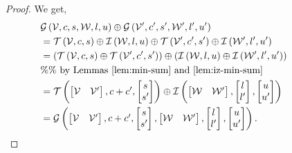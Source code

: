 \begin{proof}
  We get,
  \begin{align*}
& \mathcal{G}\left(\mathcal{V},c,s,\mathcal{W},l,u\right)\oplus \mathcal{G}\left(\mathcal{V}^\prime,c^\prime,s^\prime,\mathcal{W}^\prime,l^\prime,u^\prime\right)\\
& =
    \mathit{\operatorname{\mathcal{T}}}\left(\mathcal{V},c,s\right)\oplus \mathit{\operatorname{\mathcal{I}}}\left(\mathcal{W},l,u\right)
    \oplus\mathit{\operatorname{\mathcal{T}}}\left(\mathcal{V}^\prime,c^\prime,s^\prime\right)\oplus \mathit{\operatorname{\mathcal{I}}}\left(\mathcal{W}^\prime,l^\prime,u^\prime\right)\\
&
    =\left(\mathit{\operatorname{\mathcal{T}}}\left(\mathcal{V},c,s\right)\oplus \mathit{\operatorname{\mathcal{T}}}\left(\mathcal{V}^\prime,c^\prime,s^\prime\right)\right)
    \oplus\left(\mathit{\operatorname{\mathcal{I}}}\left(\mathcal{W},l,u\right)\oplus \mathit{\operatorname{\mathcal{I}}}\left(\mathcal{W}^\prime,l^\prime,u^\prime\right)\right)\\
    & \%\%~\text{by Lemmas~\ref{lem:min-sum} and~\ref{lem:iz-min-sum}}\\
& = \mathit{\operatorname{\mathcal{T}}}\left(\begin{bmatrix}\mathcal{V} &
          \mathcal{V}^\prime\end{bmatrix},c+c^\prime,\begin{bmatrix}s\\s^\prime\end{bmatrix}\right)\oplus \mathit{\operatorname{\mathcal{I}}}\left(\left[\begin{matrix}\mathcal{W} &
                   \mathcal{W}^\prime\end{matrix}\right],\left[\begin{matrix}l\\l^\prime\end{matrix}\right],\left[\begin{matrix}u\\u^\prime\end{matrix}\right]\right)\\
& =  \mathcal{G}\left(\left[\begin{matrix}
    \mathcal{V} &
    \mathcal{V}^\prime
  \end{matrix}\right]
,\begin{matrix}
    c+c^\prime
  \end{matrix}
,\left[\begin{matrix}
    s\\
    s^\prime
  \end{matrix}\right]
,\left[\begin{matrix}
    \mathcal{W} &
    \mathcal{W}^\prime
  \end{matrix}\right]
,\left[\begin{matrix}
    l\\
    l^\prime
  \end{matrix}\right]
,\left[\begin{matrix}
    u\\
    u^\prime
  \end{matrix}\right]
\right).~~~~~~~~~~~~~~~~~~~\qedhere            
    \end{align*}
%
\end{proof}
